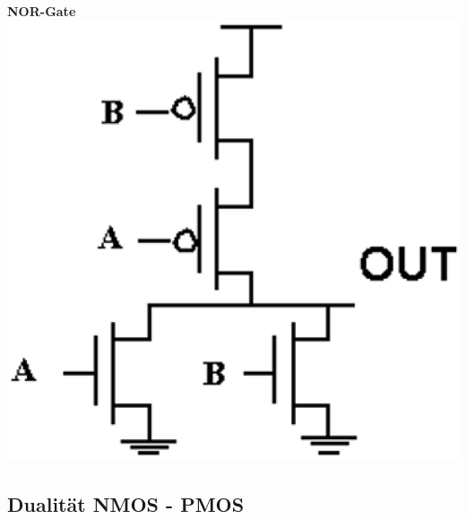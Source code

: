 \begin{minipage}[t]{0.38\columnwidth}
    \begin{center}
        \textbf{NOR-Gate} \\
        \includegraphics[width=\columnwidth]{images/cmos_nor.png}
    \end{center}
\end{minipage}


\subsection{Dualität NMOS - PMOS}

